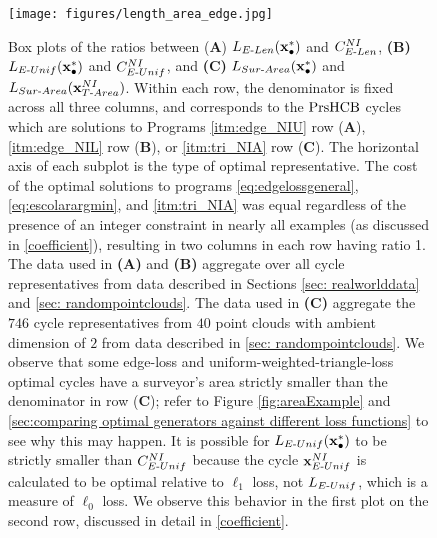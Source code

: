\begin{figure}[h!]
\begin{center}
\texttt{[image: figures/length\_area\_edge.jpg]}
\end{center}
\caption{Box plots of the ratios between (\textbf{A}) $L_{E\text{-}Len}(\mathbf{x}_\bullet^*)$ and $C_{E\text{-}Len}^{NI}$,  \textbf{(B)} $L_{E\text{-}Unif}(\mathbf{x}_\bullet^*)$ and $C_{E\text{-}Unif}^{NI}$, and  \textbf{(C)} $L_{Sur\text{-}Area}(\mathbf{x}_\bullet^*)$ and $L_{Sur\text{-}Area}(\mathbf{x} _{T\text{-}Area}^{NI})$. 
Within each row, the denominator is fixed across all three columns, and corresponds to the $\mathrm{PrsHCB}$ cycles which are solutions to Programs \ref{itm:edge_NIU} row (\textbf{A}), \ref{itm:edge_NIL} row (\textbf{B}), or \ref{itm:tri_NIA} row (\textbf{C}).
The horizontal axis of each subplot is the type of optimal representative.
The cost of the optimal solutions to programs
\pr \eqref{eq:edgelossgeneral}, \pr \eqref{eq:escolarargmin}, and \pr \ref{itm:tri_NIA} was equal regardless of the presence of an integer constraint in nearly all examples (as discussed in \se \ref{coefficient}), resulting in two columns in each row having ratio 1. 
The data used in \textbf{(A)} and \textbf{(B)} aggregate over all cycle representatives from data described in Sections \ref{sec: realworlddata} and \ref{sec: randompointclouds}. The data used in \textbf{(C)} aggregate the $746$ cycle representatives from $40$ point clouds with ambient dimension of $2$ from data described in \ref{sec: randompointclouds}. We observe that some edge-loss and uniform-weighted-triangle-loss optimal cycles have a surveyor's area strictly smaller than the denominator in row (\textbf{C}); refer to Figure \ref{fig:areaExample} and \se  \ref{sec:comparing optimal generators against different loss functions} to see why this may happen. It is possible for $L_{E\text{-}Unif}(\mathbf{x}_\bullet^*)$ to be strictly smaller than $C^{NI}_{E\text{-}Unif}$ because the cycle $\mathbf{x}^{NI}_{E\text{-}Unif}$ is calculated to be optimal relative to $\ell_1$ loss, not $L_{E\text{-}Unif}$, which is a measure of $\ell_0$ loss. We observe this behavior in the first plot on the second row, discussed in detail in \se \ref{coefficient}.} 

 \label{fig:lengthcompare}
\end{figure}
\newpage 
 
